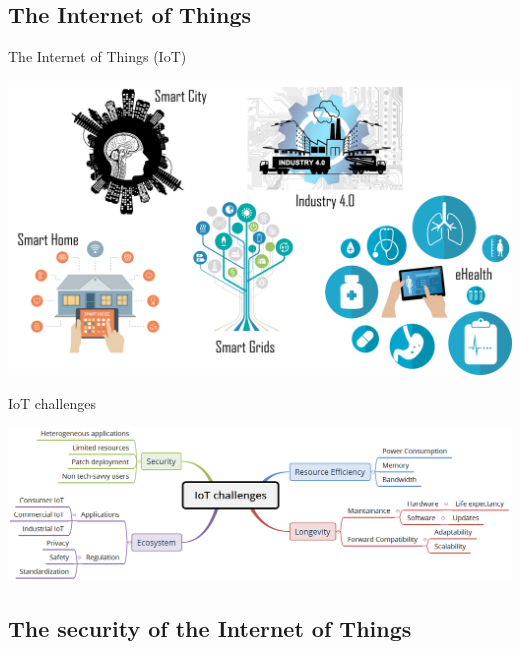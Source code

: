 \subsection[IoT]{The Internet of Things}

\begin{frame}{The Internet of Things (IoT)}
    \begin{center}
        \includegraphics[scale=0.36]{Figures/IoT.png}
    \end{center}
\end{frame}

    

\begin{frame}{IoT challenges}
    \begin{center}
        \includegraphics[scale=0.38]{Figures/IoT_challenges.png}
    \end{center}
\end{frame}

\subsection[IoT Security]{The security of the Internet of Things}

